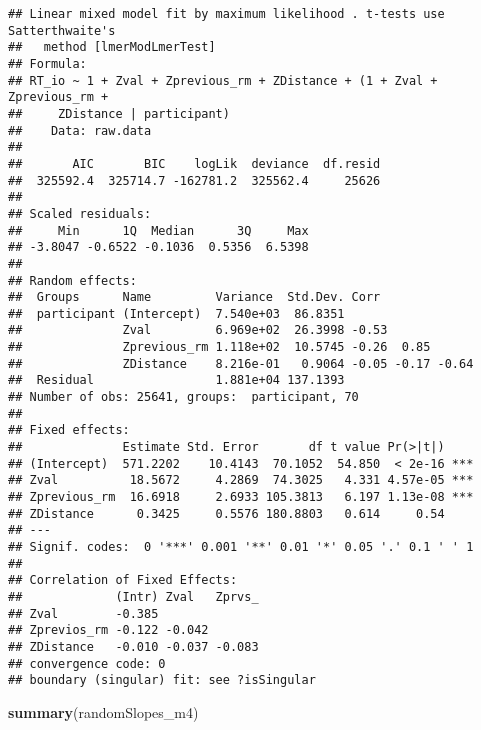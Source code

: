 \documentclass[
]{article}
\newenvironment{Shaded}{\begin{snugshade}}{\end{snugshade}}
\newcommand{\KeywordTok}[1]{\textcolor[rgb]{0.13,0.29,0.53}{\textbf{#1}}}
\newcommand{\NormalTok}[1]{#1}
\begin{document}
\begin{verbatim}
## Linear mixed model fit by maximum likelihood . t-tests use Satterthwaite's
##   method [lmerModLmerTest]
## Formula: 
## RT_io ~ 1 + Zval + Zprevious_rm + ZDistance + (1 + Zval + Zprevious_rm +  
##     ZDistance | participant)
##    Data: raw.data
## 
##       AIC       BIC    logLik  deviance  df.resid 
##  325592.4  325714.7 -162781.2  325562.4     25626 
## 
## Scaled residuals: 
##     Min      1Q  Median      3Q     Max 
## -3.8047 -0.6522 -0.1036  0.5356  6.5398 
## 
## Random effects:
##  Groups      Name         Variance  Std.Dev. Corr             
##  participant (Intercept)  7.540e+03  86.8351                  
##              Zval         6.969e+02  26.3998 -0.53            
##              Zprevious_rm 1.118e+02  10.5745 -0.26  0.85      
##              ZDistance    8.216e-01   0.9064 -0.05 -0.17 -0.64
##  Residual                 1.881e+04 137.1393                  
## Number of obs: 25641, groups:  participant, 70
## 
## Fixed effects:
##              Estimate Std. Error       df t value Pr(>|t|)    
## (Intercept)  571.2202    10.4143  70.1052  54.850  < 2e-16 ***
## Zval          18.5672     4.2869  74.3025   4.331 4.57e-05 ***
## Zprevious_rm  16.6918     2.6933 105.3813   6.197 1.13e-08 ***
## ZDistance      0.3425     0.5576 180.8803   0.614     0.54    
## ---
## Signif. codes:  0 '***' 0.001 '**' 0.01 '*' 0.05 '.' 0.1 ' ' 1
## 
## Correlation of Fixed Effects:
##             (Intr) Zval   Zprvs_
## Zval        -0.385              
## Zprevios_rm -0.122 -0.042       
## ZDistance   -0.010 -0.037 -0.083
## convergence code: 0
## boundary (singular) fit: see ?isSingular
\end{verbatim}

\begin{Shaded}
\begin{Highlighting}[]
\KeywordTok{summary}\NormalTok{(randomSlopes_m4)}
\end{Highlighting}
\end{Shaded}
\end{document}
